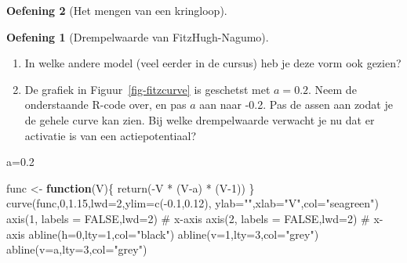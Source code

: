 \documentclass[
  a4paper,
]{scrbook}
\newenvironment{Shaded}{\begin{snugshade}}{\end{snugshade}}
\newcommand{\AttributeTok}[1]{\textcolor[rgb]{0.40,0.45,0.13}{#1}}
\newcommand{\CommentTok}[1]{\textcolor[rgb]{0.37,0.37,0.37}{#1}}
\newcommand{\ConstantTok}[1]{\textcolor[rgb]{0.56,0.35,0.01}{#1}}
\newcommand{\ControlFlowTok}[1]{\textcolor[rgb]{0.00,0.23,0.31}{\textbf{#1}}}
\newcommand{\DecValTok}[1]{\textcolor[rgb]{0.68,0.00,0.00}{#1}}
\newcommand{\FloatTok}[1]{\textcolor[rgb]{0.68,0.00,0.00}{#1}}
\newcommand{\FunctionTok}[1]{\textcolor[rgb]{0.28,0.35,0.67}{#1}}
\newcommand{\NormalTok}[1]{\textcolor[rgb]{0.00,0.23,0.31}{#1}}
\newcommand{\OtherTok}[1]{\textcolor[rgb]{0.00,0.23,0.31}{#1}}
\newcommand{\SpecialCharTok}[1]{\textcolor[rgb]{0.37,0.37,0.37}{#1}}
\newcommand{\StringTok}[1]{\textcolor[rgb]{0.13,0.47,0.30}{#1}}
\theoremstyle{definition}
\newtheorem{exercise}{Oefening}[chapter]
\theoremstyle{remark}
\begin{document}
\begin{exercise}[Het mengen van een
kringloop]
\begin{exercise}[Drempelwaarde van
FitzHugh-Nagumo]
\begin{enumerate}
\def\labelenumi{\alph{enumi}.}
\item
  In welke andere model (veel eerder in de cursus) heb je deze vorm ook
  gezien?
\item
  De grafiek in Figuur~\ref{fig-fitzcurve} is geschetst met \(a=0.2\).
  Neem de onderstaande R-code over, en pas \(a\) aan naar -0.2. Pas de
  assen aan zodat je de gehele curve kan zien. Bij welke drempelwaarde
  verwacht je nu dat er activatie is van een actiepotentiaal?
\end{enumerate}

\begin{Shaded}
\begin{Highlighting}[]
\NormalTok{a}\OtherTok{=}\FloatTok{0.2}

\NormalTok{func }\OtherTok{\textless{}{-}} \ControlFlowTok{function}\NormalTok{(V)\{}
 \FunctionTok{return}\NormalTok{(}\SpecialCharTok{{-}}\NormalTok{V }\SpecialCharTok{*}\NormalTok{ (V}\SpecialCharTok{{-}}\NormalTok{a) }\SpecialCharTok{*}\NormalTok{ (V}\DecValTok{{-}1}\NormalTok{))}
\NormalTok{\}}
\FunctionTok{curve}\NormalTok{(func,}\DecValTok{0}\NormalTok{,}\FloatTok{1.15}\NormalTok{,}\AttributeTok{lwd=}\DecValTok{2}\NormalTok{,}\AttributeTok{ylim=}\FunctionTok{c}\NormalTok{(}\SpecialCharTok{{-}}\FloatTok{0.1}\NormalTok{,}\FloatTok{0.12}\NormalTok{), }
     \AttributeTok{ylab=}\StringTok{""}\NormalTok{,}\AttributeTok{xlab=}\StringTok{"V"}\NormalTok{,}\AttributeTok{col=}\StringTok{"seagreen"}\NormalTok{)}
\FunctionTok{axis}\NormalTok{(}\DecValTok{1}\NormalTok{, }\AttributeTok{labels =} \ConstantTok{FALSE}\NormalTok{,}\AttributeTok{lwd=}\DecValTok{2}\NormalTok{) }\CommentTok{\# x{-}axis}
\FunctionTok{axis}\NormalTok{(}\DecValTok{2}\NormalTok{, }\AttributeTok{labels =} \ConstantTok{FALSE}\NormalTok{,}\AttributeTok{lwd=}\DecValTok{2}\NormalTok{) }\CommentTok{\# x{-}axis}
\FunctionTok{abline}\NormalTok{(}\AttributeTok{h=}\DecValTok{0}\NormalTok{,}\AttributeTok{lty=}\DecValTok{1}\NormalTok{,}\AttributeTok{col=}\StringTok{"black"}\NormalTok{)}
\FunctionTok{abline}\NormalTok{(}\AttributeTok{v=}\DecValTok{1}\NormalTok{,}\AttributeTok{lty=}\DecValTok{3}\NormalTok{,}\AttributeTok{col=}\StringTok{"grey"}\NormalTok{)}
\FunctionTok{abline}\NormalTok{(}\AttributeTok{v=}\NormalTok{a,}\AttributeTok{lty=}\DecValTok{3}\NormalTok{,}\AttributeTok{col=}\StringTok{"grey"}\NormalTok{)}
\end{Highlighting}
\end{Shaded}


\end{exercise}
\end{exercise}
\end{document}
